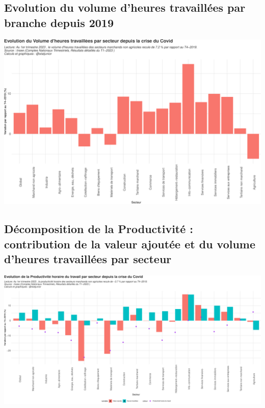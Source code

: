\documentclass[
  paper=a4,
  ,captions=tableheading
]{scrartcl}
\begin{document}
\hypertarget{evolution-du-volume-dheures-travailluxe9es-par-branche-depuis-2019}{%
\subsection{Evolution du volume d'heures travaillées par branche depuis
2019}\label{evolution-du-volume-dheures-travailluxe9es-par-branche-depuis-2019}}

\includegraphics{rapport_pdf_compte_branche_files/figure-latex/unnamed-chunk-24-1.pdf}

\hypertarget{duxe9composition-de-la-productivituxe9-contribution-de-la-valeur-ajoutuxe9e-et-du-volume-dheures-travailluxe9es-par-secteur}{%
\subsection{Décomposition de la Productivité : contribution de la valeur
ajoutée et du volume d'heures travaillées par
secteur}\label{duxe9composition-de-la-productivituxe9-contribution-de-la-valeur-ajoutuxe9e-et-du-volume-dheures-travailluxe9es-par-secteur}}

\includegraphics{rapport_pdf_compte_branche_files/figure-latex/unnamed-chunk-25-1.pdf}
\end{document}
